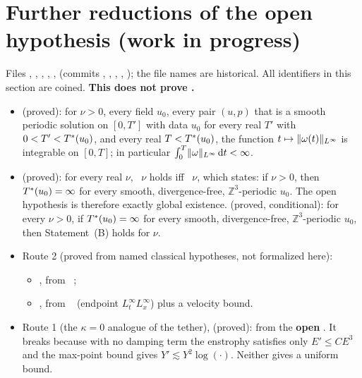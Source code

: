 \documentclass[11pt]{article}
\begin{document}
\section{Further reductions of the open hypothesis (work in progress)}\label{sec:wip}
Files , , , , ,  (commits , , , , ); the file names are historical. All identifiers in this section are coined. \textbf{This does not prove .}
\begin{itemize}
\item {} (proved): for $\nu>0$, every field $u_0$, every pair $(u,p)$ that is a smooth periodic solution on $[0,T']$ with data $u_0$ for every real $T'$ with $0<T'<T^{*}(u_0)$, and every real $T<T^{*}(u_0)$, the function $t\mapsto\lVert\omega(t)\rVert_{L^\infty}$ is integrable on $[0,T]$; in particular $\int_0^T\lVert\omega\rVert_{L^\infty}\,\mathrm{d} t<\infty$.
\item {} (proved): for every real $\nu$, ~$\nu$ holds iff ~$\nu$, which states: if $\nu>0$, then $T^{*}(u_0)=\infty$ for every smooth, divergence-free, $\mathbb{Z}^3$-periodic $u_0$. The open hypothesis is therefore exactly global existence.  (proved, conditional): for every $\nu>0$, if $T^{*}(u_0)=\infty$ for every smooth, divergence-free, $\mathbb{Z}^3$-periodic $u_0$, then Statement~(B) holds for $\nu$.
\item Route 2 (proved from named classical hypotheses, not formalized here):
  \begin{itemize}
  \item {}, from ~\cite{FujitaKato1964};
  \item {}, from ~\cite{Prodi1959,Serrin1963} (endpoint $L^\infty_tL^\infty_x$) plus a velocity bound.
  \end{itemize}
\item Route 1 (the $\kappa=0$ analogue of the tether),  (proved): from the \textbf{open} . It breaks because with no damping term the enstrophy satisfies only $E'\le CE^3$ and the max-point bound gives $Y'\lesssim Y^2\log(\cdot)$. Neither gives a uniform bound.

\end{itemize}
\end{document}
